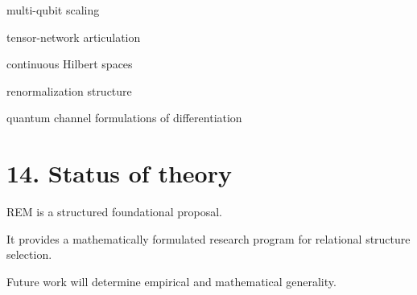 \documentclass[
]{article}
\begin{document}
multi-qubit scaling

tensor-network articulation

continuous Hilbert spaces

renormalization structure

quantum channel formulations of differentiation

\section{14. Status of theory}\label{status-of-theory}

REM is a structured foundational proposal.

It provides a mathematically formulated research program for relational
structure selection.

Future work will determine empirical and mathematical generality.
\end{document}
